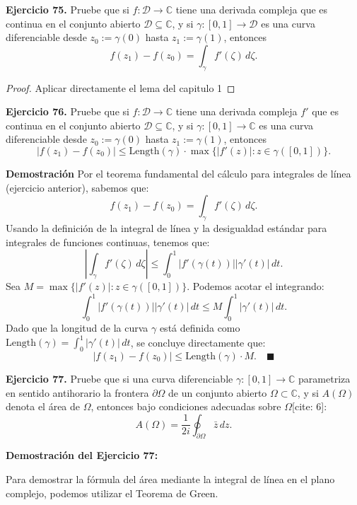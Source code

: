 \documentclass[11pt,a4paper]{article}
\theoremstyle{definition}
\theoremstyle{plain}
\theoremstyle{remark}
\begin{document}
	\noindent \textbf{Ejercicio 75.} Pruebe que si $f : \mathcal{D} \to \mathbb{C}$ tiene una derivada compleja que es continua en el conjunto abierto $\mathcal{D} \subseteq \mathbb{C}$, y si $\gamma : [0, 1] \to \mathcal{D}$ es una curva diferenciable desde $z_0 := \gamma(0)$ hasta $z_1 := \gamma(1)$, entonces
	\[
	f(z_1) - f(z_0) = \int_{\gamma} f'(\zeta) \, d\zeta.
	\]
	
	\begin{proof}
		Aplicar directamente el lema del capitulo 1
	\end{proof}
	
	\noindent \textbf{Ejercicio 76.} Pruebe que si $f : \mathcal{D} \to \mathbb{C}$ tiene una derivada compleja $f'$ que es continua en el conjunto abierto $\mathcal{D} \subseteq \mathbb{C}$, y si $\gamma : [0, 1] \to \mathbb{C}$ es una curva diferenciable desde $z_0 := \gamma(0)$ hasta $z_1 := \gamma(1)$, entonces
	\[
	|f(z_1) - f(z_0)| \leq \text{Length}(\gamma) \cdot \max\{|f'(z)| : z \in \gamma([0, 1])\}.
	\]
	
	\vspace{1em}
	\noindent \textbf{Demostración}
	Por el teorema fundamental del cálculo para integrales de línea (ejercicio anterior), sabemos que:
	\[
	f(z_1) - f(z_0) = \int_{\gamma} f'(\zeta) \, d\zeta.
	\]
	Usando la definición de la integral de línea y la desigualdad estándar para integrales de funciones continuas, tenemos que:
	\[
	\left| \int_{\gamma} f'(\zeta) \, d\zeta \right| \leq \int_0^1 |f'(\gamma(t))| |\gamma'(t)| \, dt.
	\]
	Sea $M = \max\{|f'(z)| : z \in \gamma([0, 1])\}$. Podemos acotar el integrando:
	\[
	\int_0^1 |f'(\gamma(t))| |\gamma'(t)| \, dt \leq M \int_0^1 |\gamma'(t)| \, dt.
	\]
	Dado que la longitud de la curva $\gamma$ está definida como $\text{Length}(\gamma) = \int_0^1 |\gamma'(t)| \, dt$, se concluye directamente que:
	\[
	|f(z_1) - f(z_0)| \leq \text{Length}(\gamma) \cdot M. \quad \blacksquare
	\]
	
	\noindent \textbf{Ejercicio 77.} Pruebe que si una curva diferenciable $\gamma : [0, 1] \to \mathbb{C}$ parametriza en sentido antihorario la frontera $\partial\Omega$ de un conjunto abierto $\Omega \subset \mathbb{C}$, y si $A(\Omega)$ denota el área de $\Omega$, entonces bajo condiciones adecuadas sobre $\Omega$[cite: 6]:
	\[
	A(\Omega) = \frac{1}{2i} \oint_{\partial\Omega} \bar{z} \, dz. 
	\]
	
	\noindent \textbf{Demostración del Ejercicio 77:}
	
	Para demostrar la fórmula del área mediante la integral de línea en el plano complejo, podemos utilizar el Teorema de Green. 
	
\end{document}
